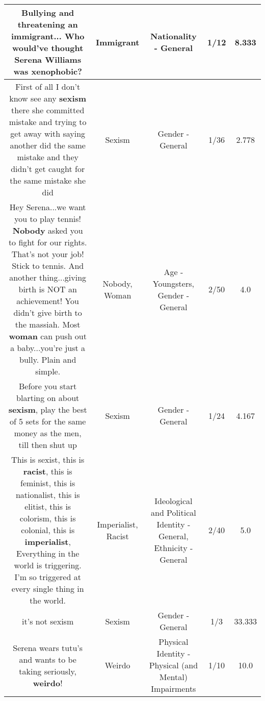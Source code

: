 \documentclass[11pt]{article}
\newlength\mylength
\begin{document}
\begin{center}
\begin{longtable}{|C{.65\mylength}|C{.30\mylength}|C{.12\mylength}|C{.12\mylength}|C{.12\mylength}|}
  \small Bullying and threatening an \textbf{immigrant}... Who would've thought Serena Williams was xenophobic?\normalsize   & Immigrant & Nationality - General & 1/12 & 8.333 \\  \hline
  \small First of all I don't know see any \textbf{sexism} there she committed mistake and trying to get away with saying another did the same mistake and they didn't get caught for the same mistake she did\normalsize   & Sexism & Gender - General & 1/36 & 2.778 \\  \hline
  \small Hey Serena...we want you to play tennis! \textbf{Nobody} asked you to fight for our rights. That's not your job! Stick to tennis. And another thing...giving birth is NOT an achievement! You didn't give birth to the massiah. Most \textbf{woman} can push out a baby...you're just a bully. Plain and simple.\normalsize   & Nobody, Woman & Age - Youngsters, Gender - General & 2/50 & 4.0 \\  \hline
  \small Before you start blarting on about \textbf{sexism}, play the best of 5 sets for the same money as the men, till then shut up\normalsize   & Sexism & Gender - General & 1/24 & 4.167 \\  \hline
  \small This is sexist, this is \textbf{racist}, this is feminist, this is nationalist, this is elitist,  this is colorism, this is colonial, this is \textbf{imperialist}, Everything in the world is triggering. I'm so triggered at every single thing in the world.\normalsize   & Imperialist, Racist &  Ideological and Political Identity - General, Ethnicity - General & 2/40 & 5.0 \\  \hline
  \small it's not sexism\normalsize   & Sexism & Gender - General & 1/3 & 33.333 \\  \hline
  \small Serena wears tutu's and wants to be taking seriously, \textbf{weirdo}!\normalsize   & Weirdo & Physical Identity - Physical (and Mental) Impairments & 1/10 & 10.0 \\  \hline

\end{longtable}
\end{center}
\end{document}
